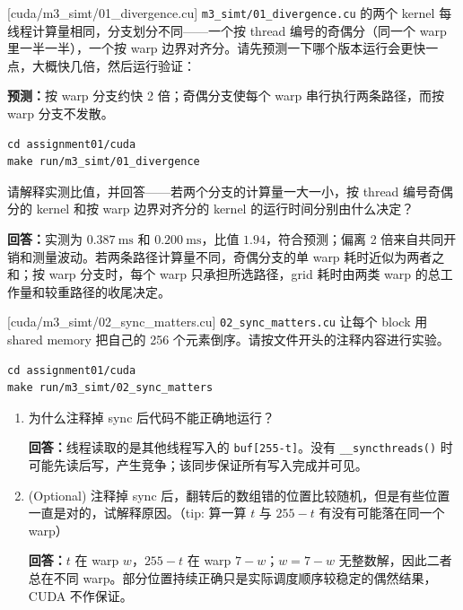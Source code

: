 \documentclass[11pt,a4paper,fontset=windows]{ctexart}
\begin{document}
[cuda/m3\_simt/01\_divergence.cu]
\texttt{m3\_simt/01\_divergence.cu} 的两个 kernel 每线程计算量相同，分支划分不同——一个按 thread 编号的奇偶分（同一个 warp 里一半一半），一个按 warp 边界对齐分。请先预测一下哪个版本运行会更快一点，大概快几倍，然后运行验证：

\par\textbf{预测：}按 warp 分支约快 2 倍；奇偶分支使每个 warp 串行执行两条路径，而按 warp 分支不发散。

\begin{lstlisting}
cd assignment01/cuda
make run/m3_simt/01_divergence
\end{lstlisting}

请解释实测比值，并回答——若两个分支的计算量一大一小，按 thread 编号奇偶分的 kernel 和按 warp 边界对齐分的 kernel 的运行时间分别由什么决定？

\par\textbf{回答：}实测为 $0.387\ \mathrm{ms}$ 和 $0.200\ \mathrm{ms}$，比值 $1.94$，符合预测；偏离 2 倍来自共同开销和测量波动。若两条路径计算量不同，奇偶分支的单 warp 耗时近似为两者之和；按 warp 分支时，每个 warp 只承担所选路径，grid 耗时由两类 warp 的总工作量和较重路径的收尾决定。

[cuda/m3\_simt/02\_sync\_matters.cu]
\texttt{02\_sync\_matters.cu} 让每个 block 用 shared memory 把自己的 256 个元素倒序。请按文件开头的注释内容进行实验。

\begin{lstlisting}
cd assignment01/cuda
make run/m3_simt/02_sync_matters
\end{lstlisting}

\begin{enumerate}[label=(\alph*)]
  \item 为什么注释掉 sync 后代码不能正确地运行？

  \par\textbf{回答：}线程读取的是其他线程写入的 \texttt{buf[255-t]}。没有 \texttt{\_\_syncthreads()} 时可能先读后写，产生竞争；该同步保证所有写入完成并可见。

  \item (Optional) 注释掉 sync 后，翻转后的数组错的位置比较随机，但是有些位置一直是对的，试解释原因。（tip: 算一算 $t$ 与 $255-t$ 有没有可能落在同一个 warp）

  \par\textbf{回答：}$t$ 在 warp $w$，$255-t$ 在 warp $7-w$；$w=7-w$ 无整数解，因此二者总在不同 warp。部分位置持续正确只是实际调度顺序较稳定的偶然结果，CUDA 不作保证。
\end{enumerate}
\end{document}
